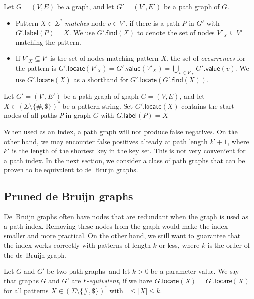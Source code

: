 \documentclass[a4paper,UKenglish]{lipics-v2016}
\newcommand{\set}[1]{\ensuremath{\{ #1 \}}}
\newcommand{\abs}[1]{\ensuremath{\lvert #1 \rvert}}
\newcommand{\find}{\ensuremath{\mathsf{find}}}
\newcommand{\locate}{\ensuremath{\mathsf{locate}}}
\newcommand{\glabel}{\ensuremath{\mathsf{label}}}
\newcommand{\gvalue}{\ensuremath{\mathsf{value}}}
\newcommand{\kequivalent}[1]{$#1$\nobreakdash-equivalent}
\newcommand{\patternset}{\ensuremath{(\Sigma \setminus \set{\#, \$})^{\ast}}}
\begin{document}
\begin{definition}
Let $G = (V, E)$ be a graph, and let $G' = (V', E')$ be a path graph of $G$.
\begin{itemize}
\item Pattern $X \in \Sigma^{\ast}$ \emph{matches} node $v \in V'$, if there is a path $P$ in $G'$ with $G'.\glabel(P) = X$. We use $G'.\find(X)$ to denote the set of nodes $V'_{X} \subseteq V'$ matching the pattern.
\item If $V'_{X} \subseteq V'$ is the set of nodes matching pattern $X$, the set of \emph{occurrences} for the pattern is $G'.\locate(V'_{X}) = G'.\gvalue(V'_{X}) = \bigcup_{v \in V'_{X}} G'.\gvalue(v)$. We use $G'.\locate(X)$ as a shorthand for $G'.\locate(G'.\find(X))$.
\end{itemize}
\end{definition}

\begin{lemma}\label{lemma:pg-fn}
Let $G' = (V', E')$ be a path graph of graph $G = (V, E)$, and let $X \in \patternset$ be a pattern string. Set $G'.\locate(X)$ contains the start nodes of all paths $P$ in graph $G$ with $G.\glabel(P) = X$.
\end{lemma}

When used as an index, a path graph will not produce false negatives. On the other hand, we may encounter false positives already at path length $k'+1$, where $k'$ is the length of the shortest key in the key set. This is not very convenient for a path index. In the next section, we consider a class of path graphs that can be proven to be equivalent to de~Bruijn graphs.


\subsection{Pruned de Bruijn graphs}

De~Bruijn graphs often have nodes that are redundant when the graph is used as a path index. Removing these nodes from the graph would make the index smaller and more practical. On the other hand, we still want to guarantee that the index works correctly with patterns of length $k$ or less, where $k$ is the order of the de~Bruijn graph.

\begin{definition}
Let $G$ and $G'$ be two path graphs, and let $k > 0$ be a parameter value. We say that graphs $G$ and $G'$ are \emph{\kequivalent{k}}, if we have $G.\locate(X) = G'.\locate(X)$ for all patterns $X \in \patternset$ with $1 \le \abs{X} \le k$.
\end{definition}
\end{document}
